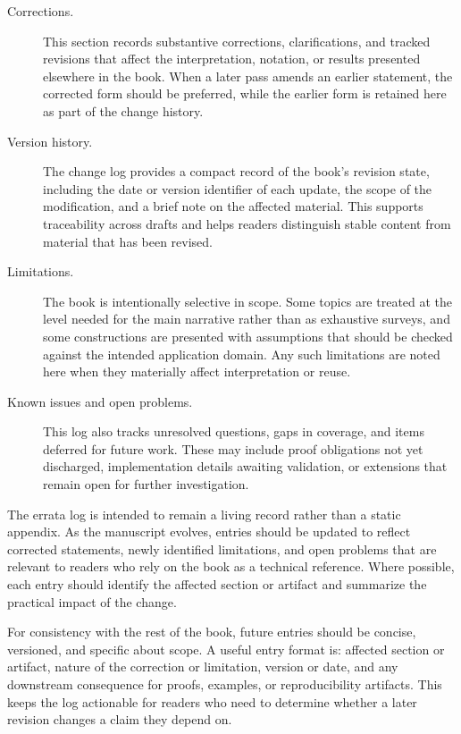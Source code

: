 \documentclass[11pt]{article}
\begin{document}

\begin{description}
  \item[Corrections.] This section records substantive corrections, clarifications, and tracked revisions that affect the interpretation, notation, or results presented elsewhere in the book. When a later pass amends an earlier statement, the corrected form should be preferred, while the earlier form is retained here as part of the change history.

  \item[Version history.] The change log provides a compact record of the book's revision state, including the date or version identifier of each update, the scope of the modification, and a brief note on the affected material. This supports traceability across drafts and helps readers distinguish stable content from material that has been revised.

  \item[Limitations.] The book is intentionally selective in scope. Some topics are treated at the level needed for the main narrative rather than as exhaustive surveys, and some constructions are presented with assumptions that should be checked against the intended application domain. Any such limitations are noted here when they materially affect interpretation or reuse.

  \item[Known issues and open problems.] This log also tracks unresolved questions, gaps in coverage, and items deferred for future work. These may include proof obligations not yet discharged, implementation details awaiting validation, or extensions that remain open for further investigation.
\end{description}

The errata log is intended to remain a living record rather than a static appendix. As the manuscript evolves, entries should be updated to reflect corrected statements, newly identified limitations, and open problems that are relevant to readers who rely on the book as a technical reference. Where possible, each entry should identify the affected section or artifact and summarize the practical impact of the change.

For consistency with the rest of the book, future entries should be concise, versioned, and specific about scope. A useful entry format is: affected section or artifact, nature of the correction or limitation, version or date, and any downstream consequence for proofs, examples, or reproducibility artifacts. This keeps the log actionable for readers who need to determine whether a later revision changes a claim they depend on.


\end{document}
